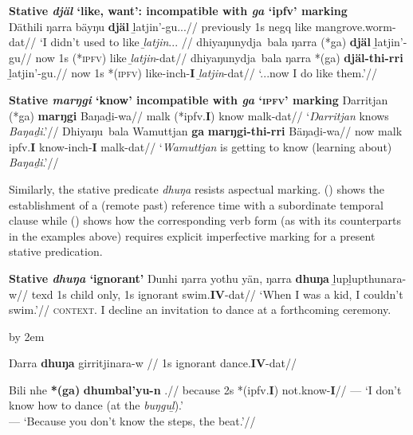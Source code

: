 \documentclass[11pt,dvipsnames]{report}
\def\beginsubsub{%
	\par
	\begingroup
	\advance\leftskip by 2em
	\def\b##1{\par\leavevmode\llap{\hbox to 2em{##1\hfil}}\ignorespaces}}
\def\endsubsub{\par\endgroup}
\begin{document}
\pex{}\textbf{Stative \textit{djäl} `like, want': incompatible with \textit{ga }`\gls{ipfv}' marking}\\
\begingl\gla Ŋäthili ŋarra bäyŋu \textbf{djäl} ḻatjin'-gu...//
\glb previously 1s \gls{negq} like mangrove.worm-\gls{dat}//
\glft`I didn't used to like \emph{ḻatjin}... //\endgl
\a{}\begingl\gla {} dhiyaŋunydja~bala ŋarra (*ga) \textbf{djäl} ḻatjin'-gu//
\glb now 1s (*\textsc{ipfv}) like \textit{ḻatjin}-\gls{dat}//
\endgl
\a{}\begingl\gla {} dhiyaŋunydja~bala ŋarra *(ga) \textbf{djäl-thi-rri} ḻatjin'-gu.//
\glb now 1s *(\textsc{ipfv}) like-\gls{inch}-\textbf{I} \textit{ḻatjin}-\gls{dat}//
\glft`...now I do like them.'\trailingcitation{[DhG~20190417]}//\endgl
\xe





\pex{}\textbf{Stative \textit{marŋgi} `know' incompatible with \textit{ga }`\textsc{ipfv}' marking}
\a\begingl\gla Ŋarritjan (*ga) \textbf{marŋgi} Baŋaḏi-wa//
\glb \gls{malk} (*\gls{ipfv}.\textbf{I}) know \gls{malk}-\gls{dat}//
\glft`\textit{Ŋarritjan} knows \textit{Baŋaḏi}.'\trailingcitation{[DhG~20190417]}//\endgl
\a\begingl\gla Dhiyaŋu~bala Wamuttjan \textbf{ga} \textbf{marŋgi-thi-rri} Bäŋaḏi-wa//
\glb now \gls{malk} \gls{ipfv}.\textbf{I} know-\gls{inch}-\textbf{I} \gls{malk}-\gls{dat}//
\glft`\textit{Wamuttjan} is getting to know (learning about) \textit{Baŋaḏi}.'\trailingcitation{[DhG~20190417]}//\endgl\xe

Similarly, the stative predicate \textit{dhuŋa} resists aspectual marking. () shows the establishment of a (remote past) reference time with a subordinate temporal clause while () shows how the corresponding verb form (as with its counterparts in the examples above) requires explicit imperfective marking for a present stative predication.


\pex{}\textbf{Stative \textit{dhuŋa} `ignorant'}
\a{}\begingl\gla Ŋunhi ŋarra yothu yän, ŋarra \textbf{dhuŋa} ḻupḻupthunara-w//
\glb\gls{texd} 1s child only, 1s ignorant swim.\textbf{IV}-\gls{dat}//
\glft`When I was a kid, I couldn't swim.'\trailingcitation{[AW~20190429]}//\endgl
\a {}\textsc{context.} I decline an invitation to dance at a forthcoming ceremony.\beginsubsub\b{i.}\begingl \gla \nogloss{---} Ŋarra \textbf{dhuŋa} girritjinara-w //
\glb 1s ignorant dance.\textbf{IV}-\gls{dat}//
\endgl
\b{ii.}\begingl\gla \nogloss{---} Bili nhe \textbf{*(ga)} \textbf{dhumbal'yu-n} .//
\glb because 2s *(\gls{ipfv}.\textbf{I}) not.know-\textbf{I}//
\glft --- `I don't know how to dance (at the \textit{buŋguḻ}).'\\
--- `Because you don't know the steps, the beat.'\trailingcitation{[AW~20190429]}//\endgl
\endsubsub\xe
\end{document}
